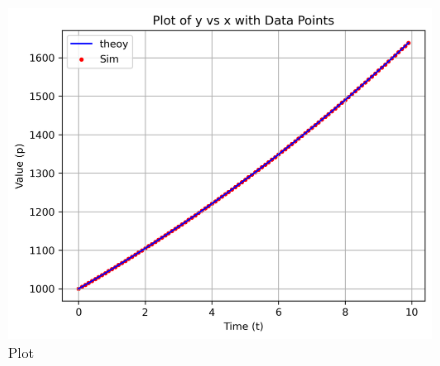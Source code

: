 \documentclass[journal]{IEEEtran}
\begin{document}
\begin{figure}[htbp] %
    \centering
    \includegraphics[width=\textwidth]{fig/plot.png} %
    \caption{Plot}
\end{figure}
\end{document}
